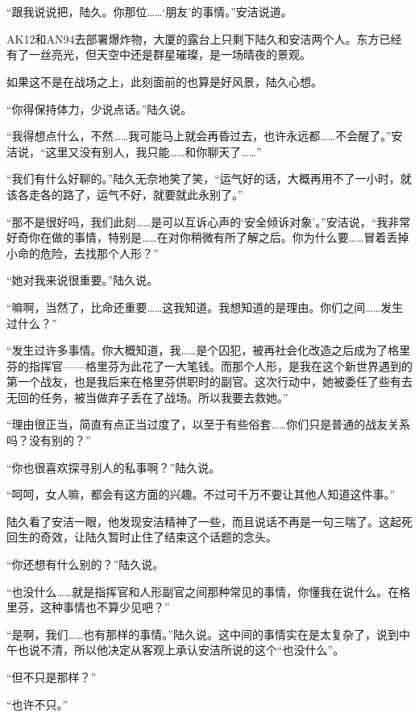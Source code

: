 \section*{}

“跟我说说把，陆久。你那位……‘朋友’的事情。”安洁说道。

AK12和AN94去部署爆炸物，大厦的露台上只剩下陆久和安洁两个人。东方已经有了一丝亮光，但天空中还是群星璀璨，是一场晴夜的景观。

如果这不是在战场之上，此刻面前的也算是好风景，陆久心想。

“你得保持体力，少说点话。”陆久说。

“我得想点什么，不然……我可能马上就会再昏过去，也许永远都……不会醒了。”安洁说，“这里又没有别人，我只能……和你聊天了……”

“我们有什么好聊的。”陆久无奈地笑了笑，“运气好的话，大概再用不了一小时，就该各走各的路了，运气不好，就要就此永别了。”

“那不是很好吗，我们此刻……是可以互诉心声的‘安全倾诉对象’。”安洁说，“我非常好奇你在做的事情，特别是……在对你稍微有所了解之后。你为什么要……冒着丢掉小命的危险，去找那个人形？”

“她对我来说很重要。”陆久说。

“嘛啊，当然了，比命还重要……这我知道。我想知道的是理由。你们之间……发生过什么？”

“发生过许多事情。你大概知道，我……是个囚犯，被再社会化改造之后成为了格里芬的指挥官——格里芬为此花了一大笔钱。而那个人形，是我在这个新世界遇到的第一个战友，也是我后来在格里芬供职时的副官。这次行动中，她被委任了些有去无回的任务，被当做弃子丢在了战场。所以我要去救她。”

“理由很正当，简直有点正当过度了，以至于有些俗套……你们只是普通的战友关系吗？没有别的？”

“你也很喜欢探寻别人的私事啊？”陆久说。

“呵呵，女人嘛，都会有这方面的兴趣。不过可千万不要让其他人知道这件事。”

陆久看了安洁一眼，他发现安洁精神了一些，而且说话不再是一句三喘了。这起死回生的奇效，让陆久暂时止住了结束这个话题的念头。

“你还想有什么别的？”陆久说。

“也没什么……就是指挥官和人形副官之间那种常见的事情，你懂我在说什么。在格里芬，这种事情也不算少见吧？”

“是啊，我们……也有那样的事情。”陆久说。这中间的事情实在是太复杂了，说到中午也说不清，所以他决定从客观上承认安洁所说的这个“也没什么”。

“但不只是那样？”

“也许不只。”

